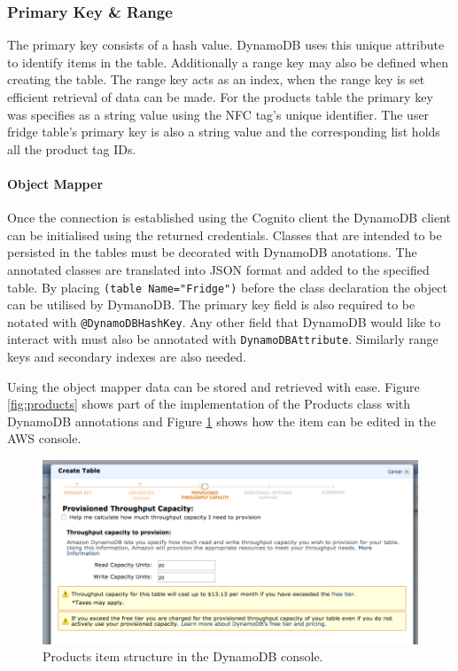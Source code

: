 \documentclass[a4paper, 11pt]{article}
\begin{document}
\subsubsection{Primary Key \& Range}
The primary key consists of a hash value. DynamoDB uses this unique attribute to identify items in the table. Additionally a range key may also be defined when creating the table. The range key acts as an index, when the range key is set efficient retrieval of data can be made. For the products table the primary key was specifies as a string value using the NFC tag's unique identifier. The user fridge table's primary key is also a string value and the corresponding list holds all the product tag IDs.

\paragraph{Object Mapper}
Once the connection is established using the Cognito client the DynamoDB client can be initialised using the returned credentials. Classes that are intended to be persisted in the tables must be decorated with DynamoDB anotations. The annotated classes are translated into JSON format and added to the specified table. By placing \texttt{\@DynamoDBTable(table Name="Fridge")} before the class declaration the object can be utilised by DymanoDB. The primary key field is also required to be notated with \texttt{@DynamoDBHashKey}. Any other field that DynamoDB would like to interact with must also be annotated with \texttt{DynamoDBAttribute}. Similarly range keys and secondary indexes are also needed.  

Using the object mapper data can be stored and retrieved with ease. Figure \ref{fig:products} shows part of the implementation of the Products class with DynamoDB annotations and Figure \ref{fig:datastruct} shows how the item can be edited in the AWS console.


\vspace{\baselineskip}

\begin{figure}[!htbp]
\centering
\includegraphics[width=\textwidth]{datastruct}
\caption{Products item structure in the DynamoDB console.}\label{fig:datastruct}
\end{figure}
\end{document}
